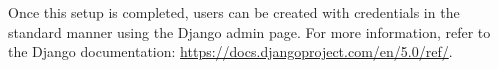 
Once this setup is completed, users can be created with credentials in the standard manner using the Django admin page. For more information, refer to the Django documentation: \url{https://docs.djangoproject.com/en/5.0/ref/}.

\endgroup